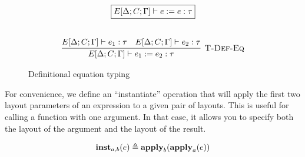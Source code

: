 \begin{figure}
  \[
    \begin{array}{c}
      \fbox{$E[\Delta;C;\Gamma] \vdash e := e : \tau$}
      \fboxNewlines
      \labinfer[T-Def-Eq]{E[\Delta;C;\Gamma] \vdash e_1 \defeq e_2 : \tau}
        {E[\Delta;C;\Gamma] \vdash e_1 : \tau
        &E[\Delta;C;\Gamma] \vdash e_2 : \tau}
    \end{array}
  \]
  \caption{Definitional equation typing}
  \label{fig:def-eq}
\end{figure}

For convenience, we define an ``instantiate'' operation \instExpr{} that will apply the first two
layout parameters of an expression to a given pair of layouts. This is useful for calling a function
with one argument. In that case, it allows you to specify both the layout of the argument and the
layout of the result.

\[
  \textbf{inst}_{a,b}(e) \triangleq \textbf{apply}_b(\textbf{apply}_a(e))
\]


